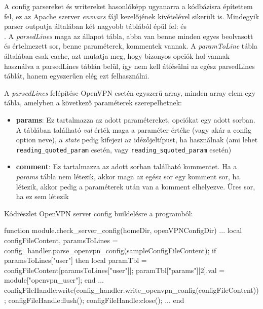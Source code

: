 A config parsereket és writereket hasonlóképp ugyanarra a kódbázisra építettem fel, ez az Apache szerver \textit{envvars} fájl kezelőjének kivételével sikerült is. Mindegyik parser outputja általában két nagyobb táblából épül fel: \texttt{} és\\\texttt{}.
A \textit{parsedLines} maga az állapot tábla, abba van benne minden egyes beolvasott és értelmezett sor, benne paraméterek, kommentek vannak. A \textit{paramToLine} tábla általában csak cache, azt mutatja meg, hogy bizonyos opciók hol vannak használva a parsedLines táblán belül, így nem kell átfésülni az egész parsedLines táblát, hanem egyszerűen elég ezt felhasználni.

A \textit{parsedLines} felépítése OpenVPN esetén egyszerű array, minden array elem egy tábla, amelyben a következő paraméterek szerepelhetnek:

\begin{itemize}
	\item \textbf{params}: Ez tartalmazza az adott paramétereket, opciókat egy adott sorban. A táblában található \textit{val} érték maga a paraméter értéke (vagy akár a config option neve), a \textit{state} pedig kifejezi az idézőjeltípust, ha használnak (ami lehet \texttt{reading\_quoted\_param}  esetén, vagy \texttt{reading\_squoted\_param}  esetén)
	\item \textbf{comment}: Ez tartalmazza az adott sorban található kommentet. Ha a \textit{params} tábla nem létezik, akkor maga az egész sor egy komment sor, ha létezik, akkor pedig a paraméterek után van a komment elhelyezve. Üres sor, ha ez sem létezik
\end{itemize}

Kódrészlet OpenVPN server config buildelésre a programból:

\begin{lua}
function module.check_server_config(homeDir, openVPNConfigDir)
	...
        local configFileContent, paramsToLines = config_handler.parse_openvpn_config(sampleConfigFileContent);
        if paramsToLines["user"] then
            local paramTbl = configFileContent[paramsToLines["user"]];
            paramTbl["params"][2].val = module["openvpn_user"];
        end
	...
        configFileHandle:write(config_handler.write_openvpn_config(configFileContent));
        configFileHandle:flush();
        configFileHandle:close();
	...
end
\end{lua}
\pagebreak

